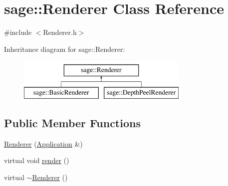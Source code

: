 \hypertarget{classsage_1_1Renderer}{}\section{sage\+::Renderer Class Reference}
\label{classsage_1_1Renderer}


{\ttfamily \#include $<$Renderer.\+h$>$}

Inheritance diagram for sage\+::Renderer\+:\begin{figure}[H]
\begin{center}
\leavevmode
\includegraphics[height=2.000000cm]{classsage_1_1Renderer}
\end{center}
\end{figure}
\subsection*{Public Member Functions}
\begin{DoxyCompactItemize}
\item 
\mbox{\hyperlink{classsage_1_1Renderer_aea1ceb080017504798f28cde4d45502e}{Renderer}} (\mbox{\hyperlink{classsage_1_1Application}{Application}} \&)
\item 
virtual void \mbox{\hyperlink{classsage_1_1Renderer_af7e5f8f68742f198e315fb4683a605a4}{render}} ()
\item 
virtual \mbox{\hyperlink{classsage_1_1Renderer_afeee408862d5bd6255a6882d47e6d5cd}{$\sim$\+Renderer}} ()
\end{DoxyCompactItemize}
